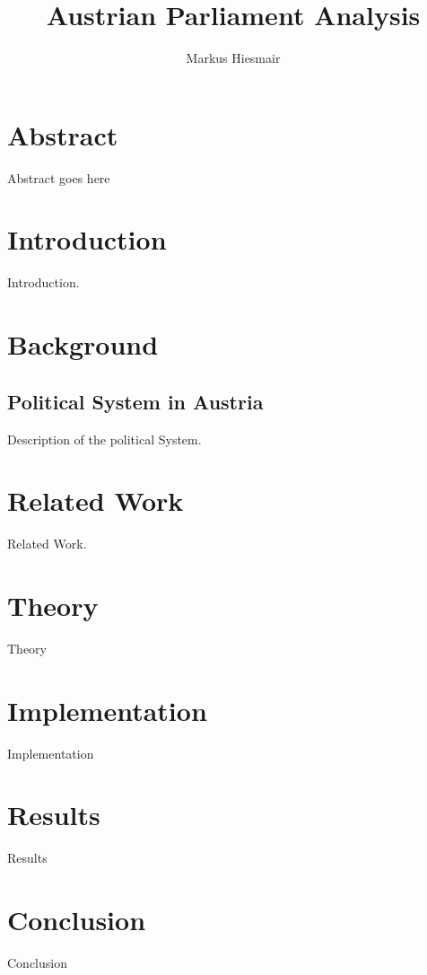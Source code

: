 \documentclass[12pt]{report}
\title{Austrian Parliament Analysis}
\author{Markus Hiesmair}
\begin{document}
\maketitle
\newpage

\chapter*{Abstract}
Abstract goes here

\tableofcontents


\chapter{Introduction}
Introduction.

\chapter{Background}

\section{Political System in Austria}
Description of the political System.

\chapter{Related Work}
Related Work.

\chapter{Theory}
Theory

\chapter{Implementation}
Implementation

\chapter{Results}
Results

\chapter{Conclusion}
Conclusion
\end{document}
